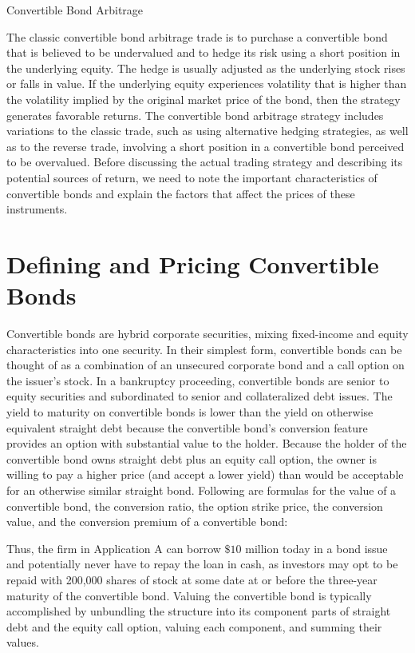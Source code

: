 \documentclass[11pt]{article}
\begin{document}
Convertible Bond Arbitrage

The classic convertible bond arbitrage trade is to purchase a convertible bond that is believed to be undervalued and to hedge its risk using a short position in the underlying equity. The hedge is usually adjusted as the underlying stock rises or falls in value. If the underlying equity experiences volatility that is higher than the volatility implied by the original market price of the bond, then the strategy generates favorable returns. The convertible bond arbitrage strategy includes variations to the classic trade, such as using alternative hedging strategies, as well as to the reverse trade, involving a short position in a convertible bond perceived to be overvalued. Before discussing the actual trading strategy and describing its potential sources of return, we need to note the important characteristics of convertible bonds and explain the factors that affect the prices of these instruments.

\section*{Defining and Pricing Convertible Bonds}
Convertible bonds are hybrid corporate securities, mixing fixed-income and equity characteristics into one security. In their simplest form, convertible bonds can be thought of as a combination of an unsecured corporate bond and a call option on the issuer's stock. In a bankruptcy proceeding, convertible bonds are senior to equity securities and subordinated to senior and collateralized debt issues. The yield to maturity on convertible bonds is lower than the yield on otherwise equivalent straight debt because the convertible bond's conversion feature provides an option with substantial value to the holder. Because the holder of the convertible bond owns straight debt plus an equity call option, the owner is willing to pay a higher price (and accept a lower yield) than would be acceptable for an otherwise similar straight bond. Following are formulas for the value of a convertible bond, the conversion ratio, the option strike price, the conversion value, and the conversion premium of a convertible bond:

Thus, the firm in Application A can borrow $\$ 10$ million today in a bond issue and potentially never have to repay the loan in cash, as investors may opt to be repaid with 200,000 shares of stock at some date at or before the three-year maturity of the convertible bond. Valuing the convertible bond is typically accomplished by unbundling the structure into its component parts of straight debt and the equity call option, valuing each component, and summing their values.
\end{document}
